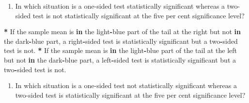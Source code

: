 \documentclass[a4paper]{book}
\newenvironment{Shaded}{\begin{snugshade}}{\end{snugshade}}
\newcommand{\StringTok}[1]{\textcolor[rgb]{0.00,0.00,0.00}{#1}}
\newcommand{\ControlFlowTok}[1]{\textcolor[rgb]{0.00,0.00,0.00}{\textbf{#1}}}
\newcommand{\OperatorTok}[1]{\textcolor[rgb]{0.00,0.00,0.00}{\textbf{#1}}}
\newcommand{\NormalTok}[1]{#1}
\providecommand{\tightlist}{%
  \setlength{\itemsep}{0pt}\setlength{\parskip}{0pt}}
\theoremstyle{definition}
\theoremstyle{definition}
\theoremstyle{definition}
\theoremstyle{remark}
\begin{document}
\begin{enumerate}
\def\labelenumi{\arabic{enumi}.}
\setcounter{enumi}{2}
\tightlist
\item
  In which situation is a one-sided test statistically significant
  whereas a two-sided test is not statistically significant at the five
  per cent significance level?
\end{enumerate}

\begin{Shaded}
\begin{Highlighting}[]
\OperatorTok{*}\StringTok{ }\NormalTok{If the sample mean is }\ControlFlowTok{in}\NormalTok{ the light}\OperatorTok{-}\NormalTok{blue part of the tail at the right but not}
\ControlFlowTok{in}\NormalTok{ the dark}\OperatorTok{-}\NormalTok{blue part, a right}\OperatorTok{-}\NormalTok{sided test is statistically significant but a}
\NormalTok{two}\OperatorTok{-}\NormalTok{sided test is not.}
\OperatorTok{*}\StringTok{ }\NormalTok{If the sample mean is }\ControlFlowTok{in}\NormalTok{ the light}\OperatorTok{-}\NormalTok{blue part of the tail at the left but not}
\ControlFlowTok{in}\NormalTok{ the dark}\OperatorTok{-}\NormalTok{blue part, a left}\OperatorTok{-}\NormalTok{sided test is statistically significant but a}
\NormalTok{two}\OperatorTok{-}\NormalTok{sided test is not.}
\end{Highlighting}
\end{Shaded}

\begin{enumerate}
\def\labelenumi{\arabic{enumi}.}
\setcounter{enumi}{3}
\tightlist
\item
  In which situation is a one-sided test not statistically significant
  whereas a two-sided test is statistically significant at the five per
  cent significance level?
\end{enumerate}
\end{document}
